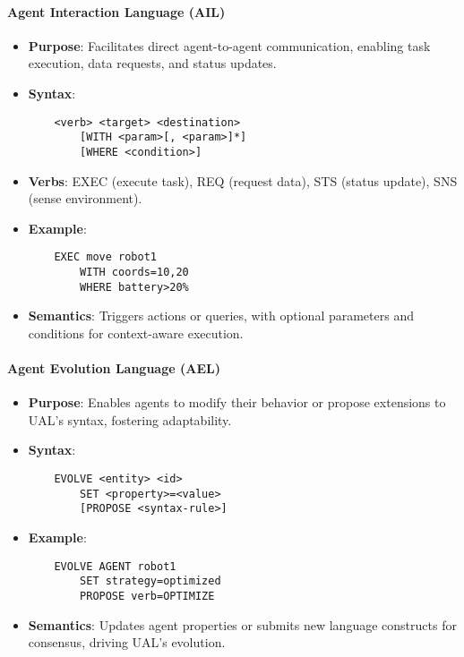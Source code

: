 \documentclass[a4paper,11pt]{article}
\begin{document}
\paragraph{Agent Interaction Language (AIL)}
\begin{itemize}[leftmargin=*]
    \item \textbf{Purpose}: Facilitates direct agent-to-agent communication, enabling task execution, data requests, and status updates.
    \item \textbf{Syntax}: 
    \begin{verbatim}
    <verb> <target> <destination>
        [WITH <param>[, <param>]*]
        [WHERE <condition>]
    \end{verbatim}
    \item \textbf{Verbs}: EXEC (execute task), REQ (request data), STS (status update), SNS (sense environment).
    \item \textbf{Example}: 
    \begin{verbatim}
    EXEC move robot1
        WITH coords=10,20
        WHERE battery>20%
    \end{verbatim}
    \item \textbf{Semantics}: Triggers actions or queries, with optional parameters and conditions for context-aware execution.
\end{itemize}

\paragraph{Agent Evolution Language (AEL)}
\begin{itemize}[leftmargin=*]
    \item \textbf{Purpose}: Enables agents to modify their behavior or propose extensions to UAL’s syntax, fostering adaptability.
    \item \textbf{Syntax}: 
    \begin{verbatim}
    EVOLVE <entity> <id>
        SET <property>=<value>
        [PROPOSE <syntax-rule>]
    \end{verbatim}
    \item \textbf{Example}: 
    \begin{verbatim}
    EVOLVE AGENT robot1
        SET strategy=optimized
        PROPOSE verb=OPTIMIZE
    \end{verbatim}
    \item \textbf{Semantics}: Updates agent properties or submits new language constructs for consensus, driving UAL’s evolution.
\end{itemize}
\end{document}
